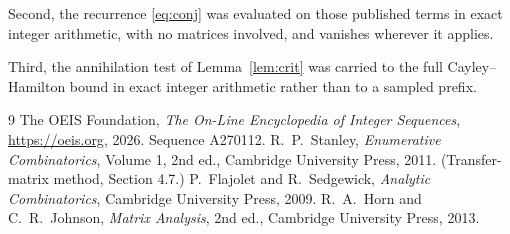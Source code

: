\documentclass[11pt,a4paper]{article}
\theoremstyle{plain}
\theoremstyle{definition}
\begin{document}
Second, the recurrence \eqref{eq:conj} was evaluated on those published terms in exact
integer arithmetic, with no matrices involved, and vanishes wherever it applies.

Third, the annihilation test of Lemma~\ref{lem:crit} was carried to the full
Cayley--Hamilton bound in exact integer arithmetic rather than to a sampled prefix.

\begin{thebibliography}{9}
 The OEIS Foundation, \emph{The On-Line Encyclopedia of Integer
Sequences}, \url{https://oeis.org}, 2026. Sequence A270112.
 R.~P.~Stanley, \emph{Enumerative Combinatorics}, Volume 1, 2nd ed.,
Cambridge University Press, 2011. (Transfer-matrix method, Section 4.7.)
 P.~Flajolet and R.~Sedgewick, \emph{Analytic Combinatorics}, Cambridge
University Press, 2009.
 R.~A.~Horn and C.~R.~Johnson, \emph{Matrix Analysis}, 2nd ed., Cambridge
University Press, 2013.
\end{thebibliography}
\end{document}
